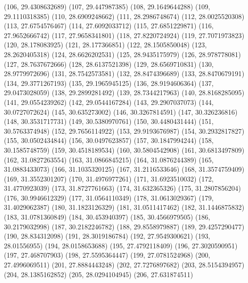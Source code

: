 {					(106, 29.4308632689)
					(107, 29.447987385)
					(108, 29.1649644288)
					(109, 29.1110318385)
					(110, 28.6909248662)
					(111, 28.2986748674)
					(112, 28.0025520308)
					(113, 27.6754576467)
					(114, 27.6092033712)
					(115, 27.6851229871)
					(116, 27.9652666742)
					(117, 27.9658341801)
					(118, 27.8220724924)
					(119, 27.7071973823)
					(120, 28.178083925)
					(121, 28.177366851)
					(122, 28.1505850048)
					(123, 28.2620405318)
					(124, 28.6626202531)
					(125, 28.9435175979)
					(126, 28.978778081)
					(127, 28.7637672666)
					(128, 28.6137521398)
					(129, 28.6569710831)
					(130, 28.9779972696)
					(131, 28.7542573581)
					(132, 28.8474396689)
					(133, 28.8470679191)
					(134, 29.3771267193)
					(135, 29.1965945125)
					(136, 28.9194606364)
					(137, 29.0473028059)
					(138, 29.2899281492)
					(139, 28.7344217963)
					(140, 28.8168285095)
					(141, 29.0554239262)
					(142, 29.0544167284)
					(143, 29.2907037073)
					(144, 30.0727072624)
					(145, 30.635273002)
					(146, 30.3267814591)
					(147, 30.326236816)
					(148, 30.3531717731)
					(149, 30.5380970761)
					(150, 30.4480431444)
					(151, 30.5763374948)
					(152, 29.7656114922)
					(153, 29.9193676987)
					(154, 30.2932817827)
					(155, 30.0502434844)
					(156, 30.0497623857)
					(157, 30.1847994244)
					(158, 30.1585748759)
					(159, 30.4518189534)
					(160, 30.5804542908)
					(161, 30.6813497809)
					(162, 31.0827263554)
					(163, 31.0866845215)
					(164, 31.0876244389)
					(165, 31.0883433073)
					(166, 31.1035320125)
					(167, 31.2116533646)
					(168, 31.3574759409)
					(169, 31.3552301207)
					(170, 31.4976977261)
					(171, 31.6923510032)
					(172, 31.4770923039)
					(173, 31.8727761663)
					(174, 31.632365326)
					(175, 31.2807856204)
					(176, 30.9946612329)
					(177, 31.0564110349)
					(178, 31.0613029367)
					(179, 31.4029062387)
					(180, 31.1823126329)
					(181, 31.0511417462)
					(182, 31.1446875832)
					(183, 31.0781360849)
					(184, 30.453940397)
					(185, 30.4566979505)
					(186, 30.2179032998)
					(187, 30.2182246782)
					(188, 29.8558979887)
					(189, 29.4257290477)
					(190, 28.834312098)
					(191, 28.3019186784)
					(192, 27.9549300621)
					(193, 28.01556955)
					(194, 28.0158653688)
					(195, 27.4792118409)
					(196, 27.3020590951)
					(197, 27.468707903)
					(198, 27.5595364447)
					(199, 27.0781524968)
					(200, 27.4996069511)
					(201, 27.8884443248)
					(202, 27.7276897682)
					(203, 28.5154394957)
					(204, 28.1385162852)
					(205, 28.0294104945)
					(206, 27.631874511)
}

